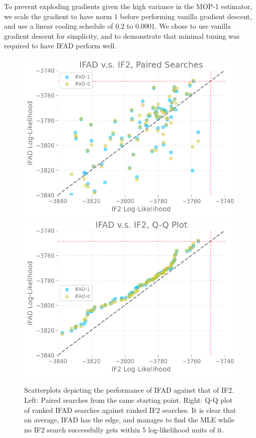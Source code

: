 \documentclass{article}
\begin{document}
To prevent exploding gradients given the high variance in the MOP-1 estimator, we scale the gradient to have norm 1 before performing vanilla gradient descent, and use a linear cooling schedule of $0.2$ to $ 0.0001$. We chose to use vanilla gradient descent for simplicity, and to demonstrate that minimal tuning was required to have IFAD perform well. 

\begin{figure}[h]
    \centering
    \includegraphics[scale=0.53]{imgs/095/pairs.png}
    \includegraphics[scale=0.53]{imgs/095/qq.png}
    \caption{Scatterplots depicting the performance of IFAD against that of IF2. Left: Paired searches from the same starting point. Right: Q-Q plot of ranked IFAD searches against ranked IF2 searches. It is clear that on average, IFAD has the edge, and manages to find the MLE while no IF2 search successfully gets within 5 log-likelihood units of it. }
    \label{fig:scatter}
\end{figure}
\end{document}

